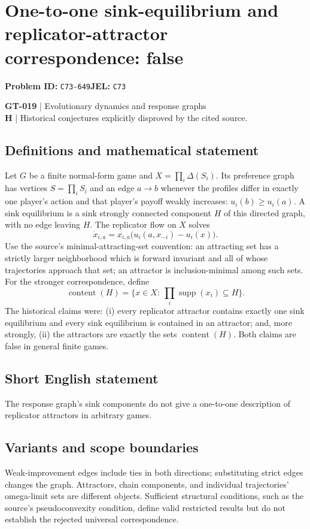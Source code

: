 \documentclass[11pt,a4paper]{article}
\begin{document}
\section*{One-to-one sink-equilibrium and replicator-attractor correspondence: false}
\textbf{Problem ID:} \texttt{C73-649}\quad \textbf{JEL:} \texttt{C73}\par
\label{problem:OP-0149}
\label{game:GT-019}
{\sffamily\small\color{muted}
\textbf{GT-019} | Evolutionary dynamics and response graphs\\
\textbf{H} | Historical conjectures explicitly disproved by the cited source.
\par}
\subsection*{Definitions and mathematical statement}
Let $G$ be a finite normal-form game and $X=\prod_i\Delta(S_i)$. Its preference graph has vertices $S=\prod_iS_i$ and an edge $a\to b$ whenever the profiles differ in exactly one player's action and that player's payoff weakly increases: $u_i(b)\geq u_i(a)$. A sink equilibrium is a sink strongly connected component $H$ of this directed graph, with no edge leaving $H$.
The replicator flow on $X$ solves
\[
 \dot x_{i,a}=x_{i,a}\bigl(u_i(a,x_{-i})-u_i(x)\bigr).
\]
Use the source's minimal-attracting-set convention: an attracting set has a strictly larger neighborhood which is forward invariant and all of whose trajectories approach that set; an attractor is inclusion-minimal among such sets. For the stronger correspondence, define
\[
 \operatorname{content}(H)=\{x\in X:\ \prod_i\operatorname{supp}(x_i)\subseteq H\}.
\]
The historical claims were: (i) every replicator attractor contains exactly one sink equilibrium and every sink equilibrium is contained in an attractor; and, more strongly, (ii) the attractors are exactly the sets $\operatorname{content}(H)$. Both claims are false in general finite games.
\subsection*{Short English statement}
The response graph's sink components do not give a one-to-one description of replicator attractors in arbitrary games.
\subsection*{Variants and scope boundaries}
Weak-improvement edges include ties in both directions; substituting strict edges changes the graph. Attractors, chain components, and individual trajectories' omega-limit sets are different objects. Sufficient structural conditions, such as the source's pseudoconvexity condition, define valid restricted results but do not establish the rejected universal correspondence.
\end{document}
